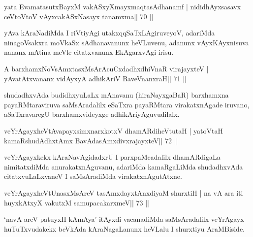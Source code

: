 \begin{shl}
yata EvamatasutxBayxM vakASxyXmayxmaqtasAdhanamf |
nididhAyxsasavx ceVtoV\s toV vAyxcakASxNasayx tanamxma\hfill || 70 ||
\end{shl}

\begin{artha}
yAva kAraNadiMda I riVtiyAgi utakxqqSaTxLAgiruveyoV, adariMda ninagoVsakxra moVkaSx sAdhanavanunx heVLuvenu, adanunx vAyxKAyxnisuva nananx mAtina meVle citatxvanunx EkAgarxvAgi irisu.
\end{artha}


\begin{shl}
A barxhamxNoV\s sAmxtasxMsArAcuCxdadhxdhiVnaR virajayxteV |
yAvatAtxvananx vidAyxyA adhikAriV BaveVnanxraH\hfill || 71 ||
\end{shl}

\begin{artha}
shudadhxvAda budidhxyuLaLx mAnavanu (hiraNayxgaBaR) barxhamxna payaRMtaraviruva saMsAradalilx eSaTxra payaRMtara virakatxnAgade iruvano, aSaTxravaregU barxhamxvideyxge adhikAriyAguvudilalx.
\end{artha}

\begin{shl}
veYrAgayxheVtAvapayxsimxnarxkotxV dhamARdiheVtutaH |
yatoV\s taH kamaRshudAdhxtAmx BavAdasAmxdivxrajayxteV\hfill || 72 ||
\end{shl}

\begin{artha}
veYrAgayxkekx kAraNavAgidadxrU I parxpaMcadalilx dhamARdigaLa nimitatxdiMda anurakatxnAguvanu, adariMda kamaRgaLiMda shudadhxvAda citatxvuLaLxvaneV I saMsAradiMda virakatxnAgutAtxne.
\end{artha}


\begin{shl}
veYrAgayxheVtUnasxMsAreV tasAmxdayxtAnxdiyaM shurxtiH |
na vA ara iti huyxkAtxyX vakutxM samupacakarxmeV\hfill || 73 ||
\end{shl}

\begin{artha}
`navA areV patuyxH kAmAya' itAyxdi vacanadiMda saMsAradalilx veYrAgayx   huTuTxvudakekx beVkAda kAraNagaLanunx heVLalu I shurxtiyu AraMBiside.
\end{artha}



